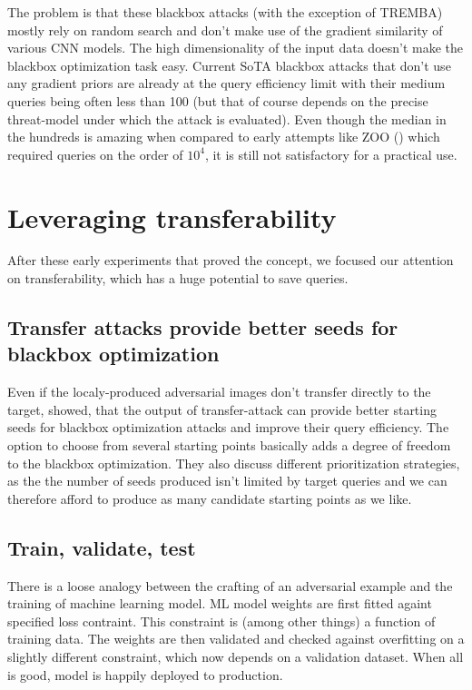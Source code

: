 The problem is that these blackbox attacks (with the exception of TREMBA) mostly rely on random search and don't make use of the gradient similarity of various CNN models. The high dimensionality of the input data doesn't make the blackbox optimization task easy. Current SoTA blackbox attacks that don't use any gradient priors are already at the query efficiency limit with their medium queries being often less than 100 (but that of course depends on the precise threat-model under which the attack is evaluated). Even though the median in the hundreds is amazing when compared to early attempts like ZOO (\cite{Chen2017ZOOZO}) which required queries on the order of $10^4$, it is still not satisfactory for a practical use. 


\section{Leveraging transferability}
\label{Leveraging_transferability}
After these early experiments that proved the concept, we focused our attention on transferability, which has a huge potential to save queries.

\subsection{Transfer attacks provide better seeds for blackbox optimization}
\label{transfer_attack_seeds}
Even if the localy-produced adversarial images don't transfer directly to the target, \cite{Suya2020HybridBA} showed, that the output of transfer-attack can provide better starting seeds for blackbox optimization attacks and improve their query efficiency. The option to choose from several starting points basically adds a degree of freedom to the blackbox optimization. They also discuss different prioritization strategies, as the the number of seeds produced isn't limited by target queries and we can therefore afford to produce as many candidate starting points as we like.

\subsection{Train, validate, test}
\label{ml_analogy}
There is a loose analogy between the crafting of an adversarial example and the training of machine learning model. ML model weights are first fitted againt specified loss contraint. This constraint is (among other things) a function of training data. The weights are then validated and checked against overfitting on a slightly different constraint, which now depends on a validation dataset. When all is good, model is happily deployed to production.

